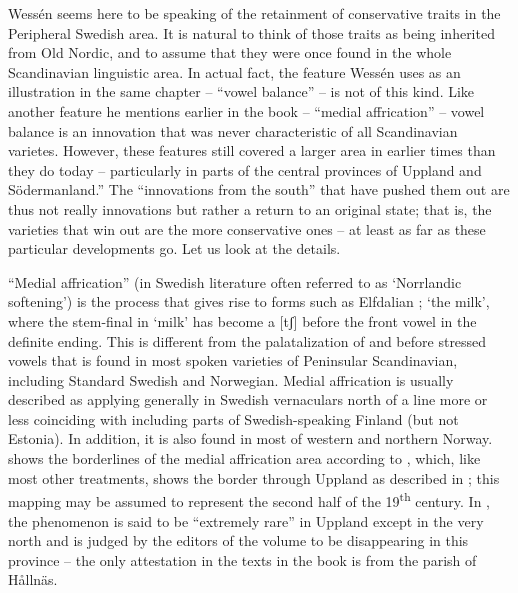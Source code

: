 
Wessén seems here to be speaking of the retainment of conservative traits in the Peripheral Swedish area. It is natural to think of those traits as being inherited from Old Nordic, and to assume that they were once found in the whole Scandinavian linguistic area. In actual fact, the feature Wessén uses as an illustration in the same chapter – “vowel balance” – is not of this kind. Like another feature he mentions earlier in the book – “medial affrication” – vowel balance is an innovation that was never characteristic of all Scandinavian varietes.  However, these features still covered a larger area in earlier times than they do today – particularly in parts of the central provinces of Uppland and Södermanland.” The “innovations from the south” that have pushed them out are thus not really innovations but rather a return to an original state; that is, the varieties that win out are the more conservative ones – at least as far as these particular developments go. Let us look at the details.

“Medial affrication” (in Swedish literature often referred to as  ‘Norrlandic softening’) is the process that gives rise to forms such as Elfdalian ; ‘the milk’, where the stem-final  in  ‘milk’ has become a [tʃ] before the front vowel in the definite ending. This is different from the palatalization of  and  before stressed vowels that is found in most spoken varieties of Peninsular Scandinavian, including Standard Swedish and Norwegian. Medial affrication is usually described as applying generally in Swedish vernaculars north of a line more or less coinciding with  including parts of Swedish-speaking Finland (but not Estonia). In addition, it is also found in most of western and northern Norway.  shows the borderlines of the medial affrication area according to \citet{Haugen1970}, which, like most other treatments, shows the border through Uppland as described in \citet{Kruuse1908}; this mapping may be assumed to represent the second half of the 19\textsuperscript{th} century. In \citet{KällskogEtAl1993}, the phenomenon is said to be “extremely rare” in Uppland except in the very north and is judged by the editors of the volume to be disappearing in this province – the only attestation in the texts in the book is from the parish of Hållnäs. 

